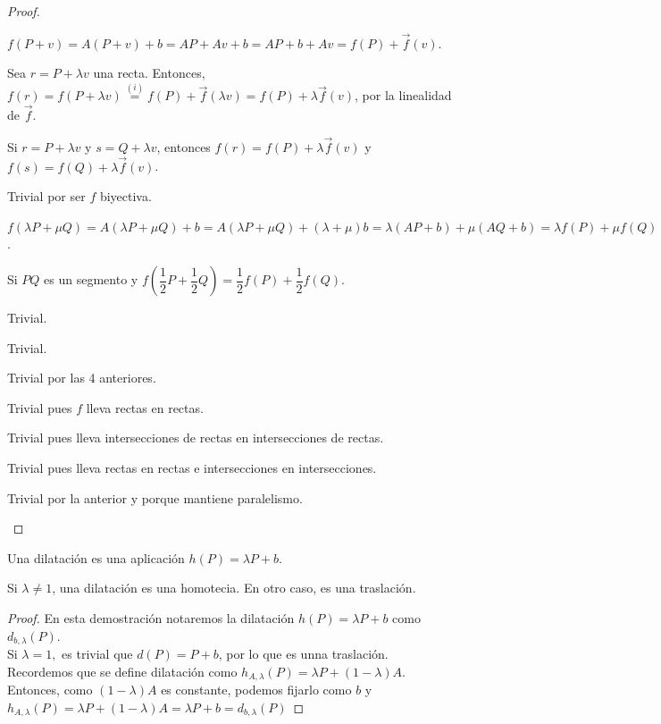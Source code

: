 \begin{proof}\hfill
  \begin{nlist}
  \item $f(P+v) = A(P+v) + b = AP + Av + b = AP + b + Av = f(P) + \vec{f}(v)$.
  \item Sea $r = P + \lambda v$ una recta. Entonces, $f(r) = f(P + \lambda v) \overset{(i)}{=} f(P) + \vec{f}(\lambda v) = f(P) + \lambda \vec{f}(v)$, por la linealidad de $\vec{f}$.
  \item Si $r = P + \lambda v$ y $s = Q + \lambda v$, entonces $f(r) = f(P) + \lambda \vec{f}(v)$ y $f(s) = f(Q) + \lambda \vec{f}(v)$.
  \item Trivial por ser $f$ biyectiva.
  \item $f(\lambda P + \mu Q) = A(\lambda P + \mu Q) + b =A(\lambda P + \mu Q) + (\lambda + \mu)b = \lambda (AP + b) + \mu (AQ + b) = \lambda f(P) + \mu f(Q)$.
  \item Si $PQ$ es un segmento y $f(\dfrac{1}{2}P + \dfrac{1}{2}Q) = \dfrac{1}{2}f(P) +  \dfrac{1}{2}f(Q)$.
  \item Trivial.
  \item Trivial.
  \item Trivial por las 4 anteriores.
  \item Trivial pues $f$ lleva rectas en rectas.
  \item Trivial pues lleva intersecciones de rectas en intersecciones de rectas.
  \item Trivial pues lleva rectas en rectas e intersecciones en intersecciones.
  \item Trivial por la anterior y porque mantiene paralelismo.


  \end{nlist}
\end{proof}


\begin{ndef}
	Una dilatación es una aplicación $h(P) = \lambda P + b$.
\end{ndef}

\begin{nprop}
Si $\lambda \ne 1$, una dilatación es una homotecia. En otro caso, es una traslación.

\end{nprop}

\begin{proof}
	En esta demostración notaremos la dilatación $h(P) = \lambda P + b$ como $d_{b,\lambda}(P)$.\\
	Si $\lambda = 1,$ es trivial que $d(P) = P + b$, por lo que es unna traslación.\\
	Recordemos que se define dilatación como $h_{A,\lambda}(P) = \lambda P + (1-\lambda)A $. Entonces, como $ (1-\lambda)A $ es constante, podemos fijarlo como $b$ y $h_{A,\lambda} (P)= \lambda P + (1-\lambda)A  = \lambda P + b  = d_{b,\lambda} (P) $
\end{proof}




